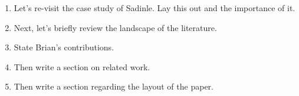 \documentclass[12pt,letterpaper]{article}
\newcommand{\1}[1]{\mathbb{I}\!\left[#1\right]} %
\begin{document}


\begin{enumerate}
\item Let's re-visit the case study of Sadinle. Lay this out and the importance of it. 
\item Next, let's briefly review the landscape of the literature. 
\item State Brian's contributions. 
\item Then write a section on related work. 
\item Then write a section regarding the layout of the paper.
\end{enumerate}


\newpage

%


\end{document}
